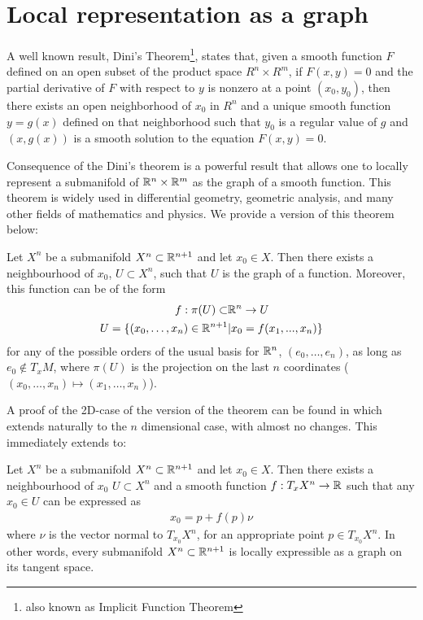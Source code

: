 \section{Local representation as a graph}

A well known result, Dini's Theorem\footnote{also known as Implicit Function Theorem}, states that, given a smooth function $F$ defined on an open subset of the product space $R^n \times R^m$, if $F(x,y) = 0$ and the partial derivative of $F$ with respect to $y$ is nonzero at a point $(x_0, y_0)$, then there exists an open neighborhood of $x_0$ in $R^n$ and a unique smooth function $y = g(x)$ defined on that neighborhood such that $y_0$ is a regular value of $g$ and $(x, g(x))$ is a smooth solution to the equation $F(x, y) = 0$.

Consequence of the Dini's theorem is a powerful result that allows one to locally represent a submanifold of $\mathbb{R}^n \times \mathbb{R}^m$ as the graph of a smooth function. This theorem is widely used in differential geometry, geometric analysis, and many other fields of mathematics and physics. We provide a version of this theorem below:

\begin{theorem}
	Let $X^n$ be a submanifold $X^n\subset\mathbb{R}^{n+1}$ and let $x_0\in X$. Then there exists a neighbourhood of $x_0$, $U\subset X^n$, such that $U$ is the graph of a function. 
	Moreover, this function can be of the form 
	\begin{align*}
		f:\pi(U)\subset&\mathbb{R}^n\rightarrow U \\
		U=\{(x_0, \dots, x_n)\in \mathbb{R}^{n+1}&|x_0= f(x_1, ..., x_n)\}
	\end{align*}
	for any of the possible orders of the usual basis for $\mathbb{R}^n$, $(e_0, \dots, e_n)$, as long as $e_0\notin T_xM$, where $\pi(U)$ is the projection on the last $n$ coordinates ($(x_0, \dots, x_n) \mapsto (x_1, \dots, x_n)$). \label{localgraphclassic}
\end{theorem}

A proof of the 2D-case of the version of the theorem can be found in \cite{DoCarmo} which extends naturally to the $n$ dimensional case, with almost no changes. This immediately extends to:

\begin{cor}
	Let $X^n$ be a submanifold $X^n\subset\mathbb{R}^{n+1}$ and let $x_0\in X$. Then there exists a neighbourhood of $x_0$ $U\subset X^n$ and a smooth function $f: T_x X^n\rightarrow \mathbb{R}$ such that any $x_0\in U$ can be expressed as \label{localgraphcorollary}
	\begin{align*}
		x_0= p + f(p) \nu 
	\end{align*}
	where $\nu$ is the vector normal to $T_{x_0} X^n$, for an appropriate point $p\in T_{x_0} X^n$. 
	In other words, every submanifold $X^n\subset\mathbb{R}^{n+1}$ is locally expressible as a graph on its tangent space. 
\end{cor}

